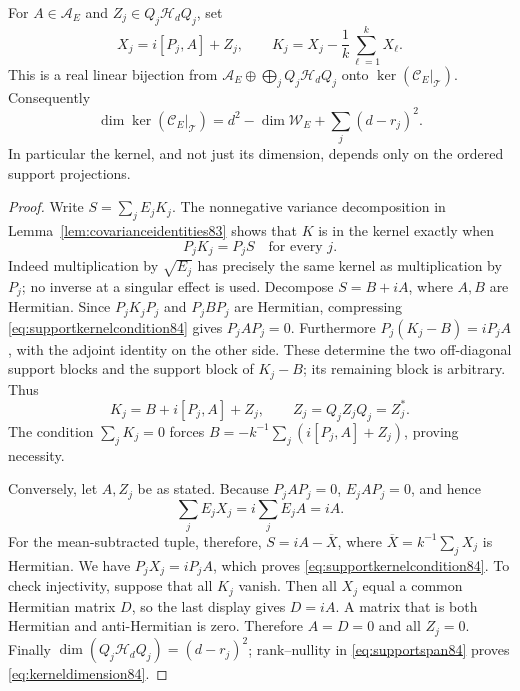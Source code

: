 \begin{theorem}\label{thm:supportkernel84}
For $A\in\mathcal A_E$ and $Z_j\in Q_j\mathcal H_dQ_j$, set
\begin{equation}\label{eq:kernelparam84}
 X_j=i[P_j,A]+Z_j,\qquad
 K_j=X_j-\frac1k\sum_{\ell=1}^kX_\ell.
\end{equation}
This is a real linear bijection from
$\mathcal A_E\oplus\bigoplus_jQ_j\mathcal H_dQ_j$ onto
$\ker(\mathcal C_E|_{\mathcal T})$.  Consequently
\begin{equation}\label{eq:kerneldimension84}
 \dim\ker(\mathcal C_E|_{\mathcal T})
 =d^2-\dim\mathcal W_E+\sum_j(d-r_j)^2.
\end{equation}
In particular the kernel, and not just its dimension, depends only
on the ordered support projections.
\end{theorem}
\begin{proof}
Write $S=\sum_jE_jK_j$.  The nonnegative variance decomposition in
Lemma~\ref{lem:covarianceidentities83} shows that $K$ is in the kernel
exactly when
\begin{equation}\label{eq:supportkernelcondition84}
 P_jK_j=P_jS\quad\text{for every }j.
\end{equation}
Indeed multiplication by $\sqrt{E_j}$ has precisely the same kernel
as multiplication by $P_j$; no inverse at a singular effect is used.
Decompose $S=B+iA$, where $A,B$ are Hermitian.  Since
$P_jK_jP_j$ and $P_jBP_j$ are Hermitian, compressing
\eqref{eq:supportkernelcondition84} gives $P_jAP_j=0$.
Furthermore $P_j(K_j-B)=iP_jA$, with the adjoint identity on the
other side.  These determine the two off-diagonal support blocks
and the support block of $K_j-B$; its remaining block is arbitrary.
Thus
\[
 K_j=B+i[P_j,A]+Z_j,\qquad Z_j=Q_jZ_jQ_j=Z_j^*.
\]
The condition $\sum_jK_j=0$ forces
$B=-k^{-1}\sum_j(i[P_j,A]+Z_j)$, proving necessity.

Conversely, let $A,Z_j$ be as stated.  Because $P_jAP_j=0$,
$E_jAP_j=0$, and hence
\[
 \sum_jE_jX_j=i\sum_jE_jA=iA.
\]
For the mean-subtracted tuple, therefore, $S=iA-\overline X$,
where $\overline X=k^{-1}\sum_jX_j$ is Hermitian.
We have $P_jX_j=iP_jA$, which proves
\eqref{eq:supportkernelcondition84}.  To check injectivity, suppose
that all $K_j$ vanish.  Then all $X_j$ equal a common Hermitian
matrix $D$, so the last display gives $D=iA$.  A matrix that is
both Hermitian and anti-Hermitian is zero.  Therefore $A=D=0$ and
all $Z_j=0$.  Finally $\dim(Q_j\mathcal H_dQ_j)=(d-r_j)^2$;
rank--nullity in \eqref{eq:supportspan84} proves
\eqref{eq:kerneldimension84}.
\end{proof}

